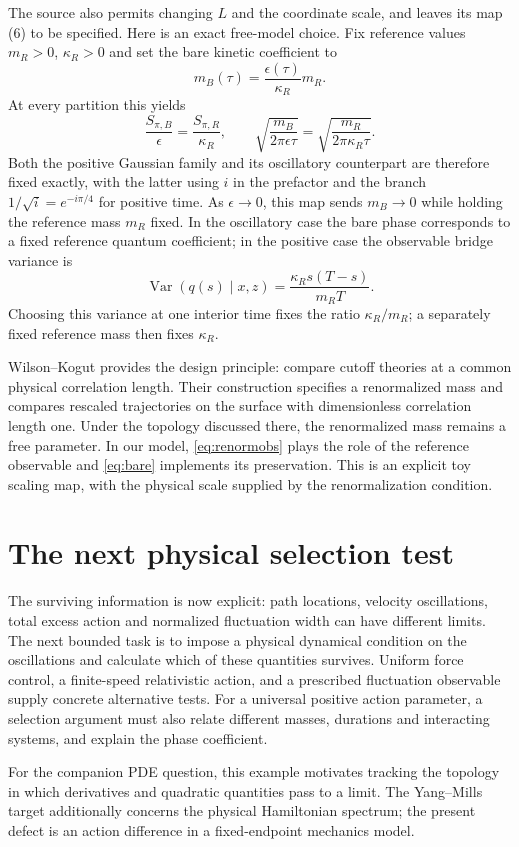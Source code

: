 \documentclass[11pt,a4paper]{article}
\begin{document}
The source also permits changing $L$ and the coordinate scale, and leaves its
map (6) to be specified. Here is an exact free-model choice. Fix reference
values $m_R>0$, $\kappa_R>0$ and set the bare kinetic coefficient to
\begin{equation}\label{eq:bare}
 m_B(\tau)=\frac{\epsilon(\tau)}{\kappa_R}m_R.
\end{equation}
At every partition this yields
\[
 \frac{S_{\pi,B}}{\epsilon}=\frac{S_{\pi,R}}{\kappa_R},\qquad
 \sqrt{\frac{m_B}{2\pi\epsilon\tau}}
 =\sqrt{\frac{m_R}{2\pi\kappa_R\tau}}.
\]
Both the positive Gaussian family and its oscillatory counterpart are therefore
fixed exactly, with the latter using $i$ in the prefactor and the branch
$1/\sqrt{i}=e^{-i\pi/4}$ for positive time. As $\epsilon\to0$, this map sends
$m_B\to0$ while holding the reference mass $m_R$ fixed. In the oscillatory
case the bare phase corresponds to a fixed reference quantum coefficient;
in the positive case the observable bridge variance is
\begin{equation}\label{eq:renormobs}
 \operatorname{Var}(q(s)\mid x,z)=\frac{\kappa_R s(T-s)}{m_RT}.
\end{equation}
Choosing this variance at one interior time fixes the ratio $\kappa_R/m_R$;
a separately fixed reference mass then fixes $\kappa_R$.

Wilson--Kogut \cite[\S12.2, pp.~166--168, Fig.~12.7]{WilsonKogut1974}
provides the design principle: compare cutoff theories at a common physical
correlation length. Their construction specifies a renormalized mass and
compares rescaled trajectories on the surface with dimensionless correlation
length one. Under the topology discussed there, the renormalized mass remains
a free parameter. In our model, \eqref{eq:renormobs} plays the role of the
reference observable and \eqref{eq:bare} implements its preservation. This is
an explicit toy scaling map, with the physical scale supplied by the
renormalization condition.

\section{The next physical selection test}
The surviving information is now explicit: path locations, velocity
oscillations, total excess action and normalized fluctuation width can have
different limits. The next bounded task is to impose a physical dynamical
condition on the oscillations and calculate which of these quantities survives.
Uniform force control, a finite-speed relativistic action, and a prescribed
fluctuation observable supply concrete alternative tests. For a universal
positive action parameter, a selection argument must also relate different
masses, durations and interacting systems, and explain the phase coefficient.

For the companion PDE question, this example motivates tracking the topology
in which derivatives and quadratic quantities pass to a limit. The
Yang--Mills target additionally concerns the physical Hamiltonian spectrum;
the present defect is an action difference in a fixed-endpoint mechanics model.



\end{document}
